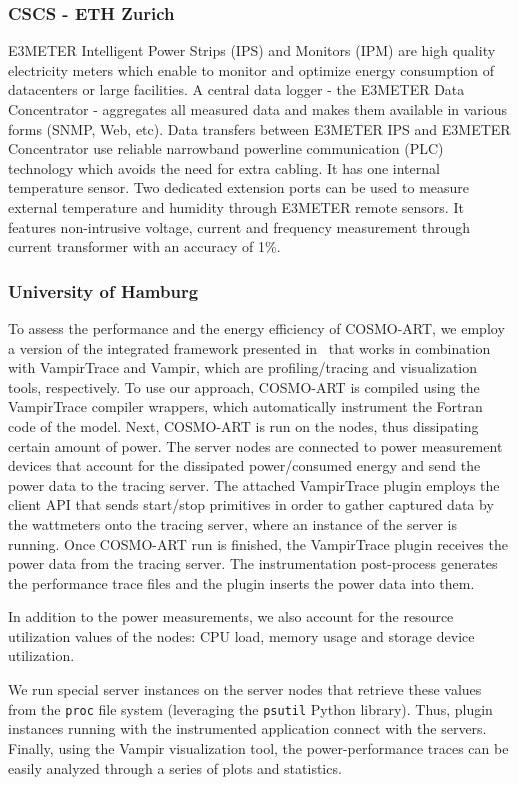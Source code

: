 \subsubsection{CSCS - ETH Zurich}
E3METER  Intelligent Power Strips  (IPS) and  Monitors (IPM)  are high
quality electricity meters which enable to monitor and optimize energy
consumption of datacenters or large facilities.  A central data logger
- the  E3METER Data Concentrator  - aggregates  all measured  data and
makes them available in various forms (SNMP, Web, etc). Data transfers
between E3METER  IPS and E3METER Concentrator  use reliable narrowband
powerline  communication (PLC)  technology which  avoids the  need for
extra cabling.  It has  one internal temperature sensor. Two dedicated
extension  ports  can be  used  to  measure  external temperature  and
humidity  through E3METER  remote sensors.  It  features non-intrusive
voltage, current and frequency measurement through current transformer
with an accuracy of 1\%.

\subsubsection{University of Hamburg}
To assess the  performance and the energy efficiency  of COSMO-ART, we
employ   a    version   of   the    integrated   framework   presented
in~\cite{energy13}  that  works in  combination  with VampirTrace  and
Vampir,   which  are   profiling/tracing   and  visualization   tools,
respectively.
To  use our  approach,  COSMO-ART is  compiled  using the  VampirTrace
compiler wrappers, which automatically  instrument the Fortran code of
the  model. Next,  COSMO-ART is  run  on the  nodes, thus  dissipating
certain  amount of  power.  The  server nodes  are connected  to power
measurement  devices that  account for  the  dissipated power/consumed
energy and  send the power data  to the tracing  server.  The attached
VampirTrace \pmlib plugin employs the client API that sends start/stop
primitives in order to gather captured data by the wattmeters onto the
tracing server,  where an  instance of the  \pmlib server  is running.
Once COSMO-ART run is finished, the VampirTrace \pmlib plugin receives
the  power   data  from  the  tracing   server.   The  instrumentation
post-process  generates the  performance  trace files  and the  \pmlib
plugin inserts the power data into them.

In  addition  to the  power  measurements,  we  also account  for  the
resource utilization values  of the nodes: CPU load,  memory usage and
storage device utilization. %

We  run special  \pmlib  server  instances on  the  server nodes  that
retrieve these  values from the \texttt{proc}  file system (leveraging
the  \texttt{psutil} Python library).   Thus, \pmlib  plugin instances
running  with the  instrumented  application connect  with the  \pmlib
servers.   Finally,   using  the   Vampir   visualization  tool,   the
power-performance traces  can be easily  analyzed through a  series of
plots and statistics.
